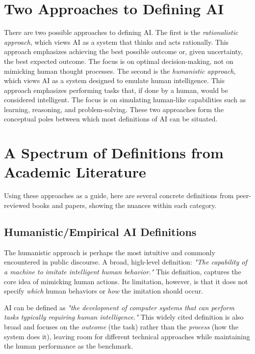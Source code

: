 \documentclass{tufte-handout}
\begin{document}
\section{Two Approaches to Defining AI}

There are  two possible approaches to defining AI. The first is the \textit{rationalistic approach}, which views AI as a system that thinks and acts rationally. This approach emphasizes achieving the best possible outcome or, given uncertainty, the best expected outcome. The focus is on optimal decision-making, not on mimicking human thought processes.
The second is the \textit{humanistic approach}, which views AI as a system designed to emulate human intelligence. This approach emphasizes performing tasks that, if done by a human, would be considered intelligent. The focus is on simulating human-like capabilities such as learning, reasoning, and problem-solving.
These two approaches form the conceptual poles between which most definitions of AI can be situated.

\section{A Spectrum of Definitions from Academic Literature}

Using these approaches as a guide, here are several concrete definitions from peer-reviewed books and papers, showing the nuances within each category.

\subsection{Humanistic/Empirical AI Definitions}

The humanistic approach is perhaps the most intuitive and commonly encountered in public discourse. A broad, high-level definition: \textit{"The capability of a machine to imitate intelligent human behavior."} This definition, captures the core idea of mimicking human actions. Its limitation, however, is that it does not specify \textit{which} human behaviors or \textit{how} the imitation should occur.

AI can be defined  as \textit{"the development of computer systems that can perform tasks typically requiring human intelligence."} This widely cited definition is also broad and focuses on the \textit{outcome} (the task) rather than the \textit{process} (how the system does it), leaving room for different technical approaches while maintaining the human performance as the benchmark.
\end{document}
